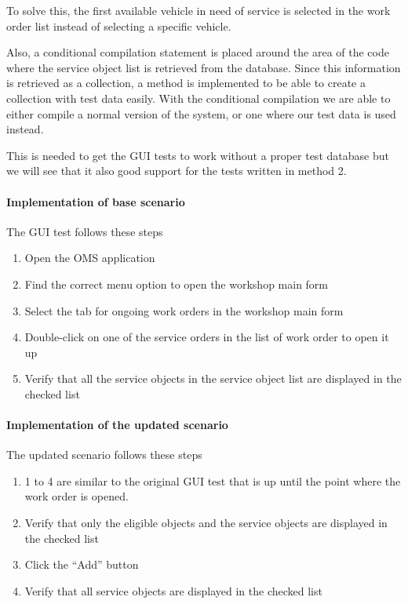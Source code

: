 \documentclass{article}
\begin{document}
				To solve this, the first available vehicle in need of service is selected in the work order list instead of selecting a specific vehicle. 

				Also, a conditional compilation statement is placed around the area of the code where the service object list is retrieved from the database. Since this information is retrieved as a collection, a method is implemented to be able to create a collection with test data easily. With the conditional compilation we are able to either compile a normal version of the system, or one where our test data is used instead. 

				This is needed to get the GUI tests to work without a proper test database but we will see that it also good support for the tests written in method 2.

				\paragraph{Implementation of base scenario}
				
				The GUI test follows these steps
			
				\begin{enumerate}
					\item Open the OMS application
					\item Find the correct menu option to open the workshop main form
					\item Select the tab for ongoing work orders in the workshop main form
					\item Double-click on one of the service orders in the list of work order to open it up
					\item Verify that all the service objects in the service object list are displayed in the checked list 
				\end{enumerate}

				\paragraph{Implementation of the updated scenario}
				The updated scenario follows these steps

				\begin{enumerate}
					\item 1 to 4 are similar to the original GUI test that is up until the point where the work order is opened.
					\item Verify that only the eligible objects and the service objects are displayed in the checked list
					\item Click the “Add” button
					\item Verify that all service objects are displayed in the checked list
				\end{enumerate}
\end{document}
